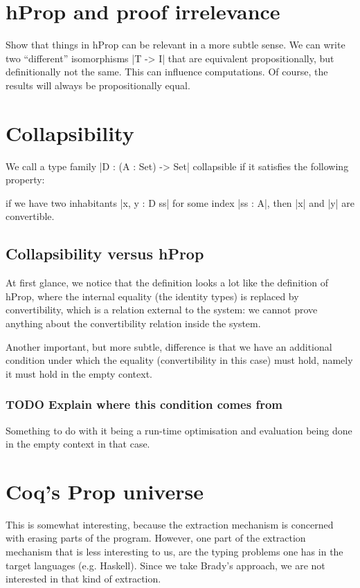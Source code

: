 \section{hProp and proof irrelevance}
\label{sec-3}


Show that things in hProp can be relevant in a more subtle sense. We
can write two ``different'' isomorphisms |T -> I| that are equivalent
propositionally, but definitionally not the same. This can influence
computations. Of course, the results will always be propositionally
equal.

\section{Collapsibility}
\label{sec-4}


We call a type family |D : (A : Set) -> Set| collapsible if it
satisfies the following property:

if we have two inhabitants |x, y : D ss| for some index |ss : A|,
then |x| and |y| are convertible.

\subsection{Collapsibility versus hProp}
\label{sec-4.1}


At first glance, we notice that the definition looks a lot like the
definition of hProp, where the internal equality (the identity types)
is replaced by convertibility, which is a relation external to the
system: we cannot prove anything about the convertibility relation
inside the system.

Another important, but more subtle, difference is that we have an
additional condition under which the equality (convertibility in this
case) must hold, namely it must hold in the empty context. 

\subsubsection{\textbf{TODO} Explain where this condition comes from}
\label{sec-4.1.1}

Something to do with it being a run-time optimisation and evaluation
being done in the empty context in that case.

\section{Coq's Prop universe}
\label{sec-5}


This is somewhat interesting, because the extraction mechanism is
concerned with erasing parts of the program. However, one part of the
extraction mechanism that is less interesting to us, are the typing
problems one has in the target languages (e.g. Haskell). Since we take
Brady's approach, we are not interested in that kind of extraction.
